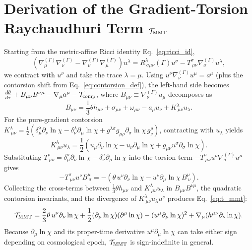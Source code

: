 \documentclass[preprint,12pt]{elsarticle}
\begin{document}
\appendix
\section{Derivation of the Gradient-Torsion Raychaudhuri Term $\mathcal{T}_{\rm MMT}$}
\label{app:tmmt}

Starting from the metric-affine Ricci identity Eq.~\eqref{eq:ricci_id},
\begin{equation}
    \left(\nabla^{(\Gamma)}_\mu \nabla^{(\Gamma)}_\nu - \nabla^{(\Gamma)}_\nu \nabla^{(\Gamma)}_\mu\right) u^\lambda = R^\lambda_{\ \sigma\mu\nu}(\Gamma) u^\sigma - T^\sigma_{\ \mu\nu} \nabla^{(\Gamma)}_\sigma u^\lambda,
\end{equation}
we contract with $u^\nu$ and take the trace $\lambda = \mu$. Using $u^\nu \nabla^{(\Gamma)}_\nu u^\mu = a^\mu$ (plus the contorsion shift from Eq.~\eqref{eq:contorsion_def}), the left-hand side becomes $\frac{d\theta}{d\tau} + B_{\mu\nu}B^{\nu\mu} - \nabla_\mu a^\mu - \mathcal{T}_{\rm comp}$, where $B_{\mu\nu} \equiv \nabla^{(\Gamma)}_\nu u_\mu$ decomposes as
\begin{equation}
    B_{\mu\nu} = \frac{1}{3}\theta h_{\mu\nu} + \sigma_{\mu\nu} + \omega_{\mu\nu} - a_\mu u_\nu + K^\lambda_{\ \mu\nu} u_\lambda.
\end{equation}
For the pure-gradient contorsion $K^\lambda_{\ \mu\nu} = \frac{1}{2}(\delta^\lambda_\mu \partial_\nu \ln\chi - \delta^\lambda_\nu \partial_\mu \ln\chi + g^{\lambda\sigma}g_{\mu\rho}\partial_\sigma\ln\chi\,g^\rho_\nu)$, contracting with $u_\lambda$ yields
\begin{equation}
    K^\lambda_{\ \mu\nu} u_\lambda = \frac{1}{2}\left(u_\mu \partial_\nu\ln\chi - u_\nu \partial_\mu\ln\chi + g_{\mu\nu} u^\sigma\partial_\sigma\ln\chi\right).
\end{equation}
Substituting $T^\sigma_{\ \mu\nu} = \delta^\sigma_\mu\partial_\nu\ln\chi - \delta^\sigma_\nu\partial_\mu\ln\chi$ into the torsion term $-T^\sigma_{\ \mu\nu} u^\nu \nabla^{(\Gamma)}_\sigma u^\mu$ gives
\begin{equation}
    -T^\sigma_{\ \mu\nu} u^\nu B^\mu_{\ \sigma} = -\left(\theta\, u^\nu\partial_\nu\ln\chi - u^\nu \partial_\mu\ln\chi\, B^\mu_{\ \nu}\right).
\end{equation}
Collecting the cross-terms between $\frac{1}{3}\theta h_{\mu\nu}$ and $K^\lambda_{\ \mu\nu}u_\lambda$ in $B_{\mu\nu}B^{\nu\mu}$, the quadratic contorsion invariants, and the divergence of $K^\lambda_{\ \mu\nu}u_\lambda u^\nu$ produces Eq.~\eqref{eq:t_mmt}:
\begin{equation}
    \mathcal{T}_{\rm MMT} = \frac{2}{3}\theta\, u^\nu \partial_\nu \ln\chi + \frac{1}{2}(\partial_\mu\ln\chi)(\partial^\mu\ln\chi) - (u^\mu\partial_\mu\ln\chi)^2 + \nabla_\mu(h^{\mu\nu}\partial_\nu\ln\chi).
\end{equation}
Because $\partial_\mu \ln\chi$ and its proper-time derivative $u^\mu\partial_\mu\ln\chi$ can take either sign depending on cosmological epoch, $\mathcal{T}_{\rm MMT}$ is sign-indefinite in general.



\end{document}
